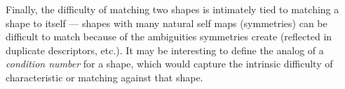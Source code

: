 Finally, the difficulty of matching two shapes is
intimately tied to matching a shape to itself --- shapes with many
natural self maps (symmetries) can be difficult to match because of
the ambiguities symmetries create (reflected in duplicate descriptors,
etc.). It may be interesting to define the analog of a {\em condition
  number} for a shape, which would capture the intrinsic difficulty of
characteristic or matching against that shape.



